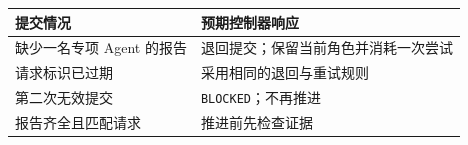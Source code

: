 \begin{tabular}{@{}P{4.0cm}P{8.5cm}@{}}
\toprule
\textbf{提交情况} & \textbf{预期控制器响应} \\
\midrule
缺少一名专项 Agent 的报告 & 退回提交；保留当前角色并消耗一次尝试 \\
请求标识已过期 & 采用相同的退回与重试规则 \\
第二次无效提交 & \texttt{BLOCKED}；不再推进 \\
报告齐全且匹配请求 & 推进前先检查证据 \\
\bottomrule
\end{tabular}
